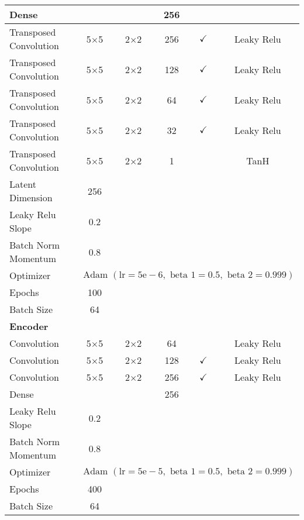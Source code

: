 \begin{longtable}[c]{@{}lccccc@{}}
	Dense & \multicolumn{1}{c}{} &  & 256 &  &  \\ \hline
	Transposed Convolution & \multicolumn{1}{c}{5$\times$5} & 2$\times$2 & 256 & $\checkmark$ & Leaky Relu \\
	Transposed Convolution & \multicolumn{1}{c}{5$\times$5} & 2$\times$2 & 128 & $\checkmark$ & Leaky Relu \\
	Transposed Convolution & \multicolumn{1}{c}{5$\times$5} & 2$\times$2 & 64 & $\checkmark$ & Leaky Relu \\
	Transposed Convolution & \multicolumn{1}{c}{5$\times$5} & 2$\times$2 & 32 & $\checkmark$ & Leaky Relu \\
	Transposed Convolution & \multicolumn{1}{c}{5$\times$5} & 2$\times$2 & 1 &  & TanH\\ \hline
	Latent Dimension & 256 & \multicolumn{1}{l}{} & \multicolumn{1}{l}{} & \multicolumn{1}{l}{} & \multicolumn{1}{l}{} \\
	Leaky Relu Slope & 0.2 & \multicolumn{1}{l}{} & \multicolumn{1}{l}{} & \multicolumn{1}{l}{} & \multicolumn{1}{l}{} \\
	Batch Norm Momentum & 0.8 & \multicolumn{1}{l}{} & \multicolumn{1}{l}{} & \multicolumn{1}{l}{} & \multicolumn{1}{l}{} \\
	Optimizer & \multicolumn{5}{l}{$\text { Adam }(\mathrm{lr}=5 \mathrm{e}-6, \text { beta } 1=0.5, \text { beta } 2=0.999)$} \\ \hline
	Epochs & 100 & \multicolumn{1}{l}{} & \multicolumn{1}{l}{} & \multicolumn{1}{l}{} & \multicolumn{1}{l}{} \\
	Batch Size & 64 & \multicolumn{1}{l}{} & \multicolumn{1}{l}{} & \multicolumn{1}{l}{} & \multicolumn{1}{l}{} \\ \hline
	\multicolumn{6}{l}{\textbf{Encoder}} \\
	Convolution & \multicolumn{1}{c}{5$\times$5} & 2$\times$2 & 64 &  & Leaky Relu \\
	Convolution & \multicolumn{1}{c}{5$\times$5} & 2$\times$2 & 128 & $\checkmark$ & Leaky Relu \\
	Convolution & \multicolumn{1}{c}{5$\times$5} & 2$\times$2 & 256 & $\checkmark$ & Leaky Relu \\
	Dense & \multicolumn{1}{c}{} &  & 256 &  &  \\ \hline
	Leaky Relu Slope & 0.2 & \multicolumn{1}{l}{} & \multicolumn{1}{l}{} & \multicolumn{1}{l}{} & \multicolumn{1}{l}{} \\
	Batch Norm Momentum & 0.8 & \multicolumn{1}{l}{} & \multicolumn{1}{l}{} & \multicolumn{1}{l}{} & \multicolumn{1}{l}{} \\
	Optimizer & \multicolumn{5}{l}{$\text { Adam }(\mathrm{lr}=5 \mathrm{e}-5, \text { beta } 1=0.5, \text { beta } 2=0.999)$} \\ \hline
	Epochs & 400 & \multicolumn{1}{l}{} & \multicolumn{1}{l}{} & \multicolumn{1}{l}{} & \multicolumn{1}{l}{} \\
	Batch Size & 64 & \multicolumn{1}{l}{} & \multicolumn{1}{l}{} & \multicolumn{1}{l}{} & \multicolumn{1}{l}{} \\ \hline
		
\end{longtable}

